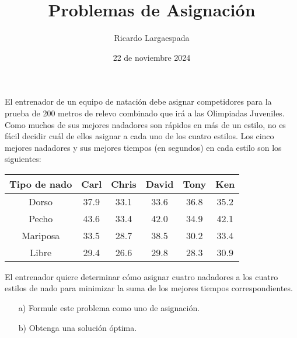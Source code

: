 \documentclass{article}
\title{Problemas de Asignación}
\author{Ricardo Largaespada}
\date{22 de noviembre 2024}
\begin{document}
\maketitle

\vspace{-1cm}
\begin{problem}
El entrenador de un equipo de natación debe asignar competidores para la prueba de 200 metros de relevo combinado que irá a las Olimpiadas Juveniles. Como muchos de sus mejores nadadores son rápidos en más de un estilo, no es fácil decidir cuál de ellos asignar a cada uno de los cuatro estilos. Los cinco mejores nadadores y sus mejores tiempos (en segundos) en cada estilo son los siguientes:

\begin{center}
\begin{tabular}{|c|c|c|c|c|c|}
\hline
\textbf{Tipo de nado} & \textbf{Carl} & \textbf{Chris} & \textbf{David} & \textbf{Tony} & \textbf{Ken} \\
\hline
Dorso & 37.9 & 33.1 & 33.6 & 36.8 & 35.2 \\
\hline
Pecho & 43.6 & 33.4 & 42.0 & 34.9 & 42.1 \\
\hline
Mariposa & 33.5 & 28.7 & 38.5 & 30.2 & 33.4 \\
\hline
Libre & 29.4 & 26.6 & 29.8 & 28.3 & 30.9 \\
\hline
\end{tabular}
\end{center}

El entrenador quiere determinar cómo asignar cuatro nadadores a los cuatro estilos de nado para minimizar la suma de los mejores tiempos correspondientes.

\begin{enumerate}
    \item[a)] Formule este problema como uno de asignación.
    \item[b)] Obtenga una solución óptima.
\end{enumerate}

\end{problem}

\vspace{-1cm}
\end{document}
